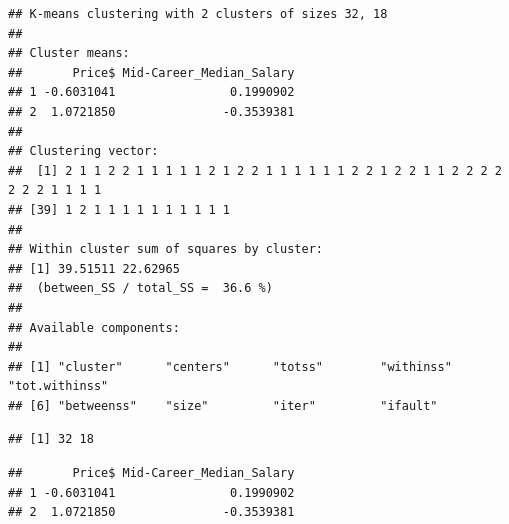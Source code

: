 \documentclass[]{article}
\newenvironment{Shaded}{\begin{snugshade}}{\end{snugshade}}
\newcommand{\KeywordTok}[1]{\textcolor[rgb]{0.13,0.29,0.53}{\textbf{#1}}}
\newcommand{\DecValTok}[1]{\textcolor[rgb]{0.00,0.00,0.81}{#1}}
\newcommand{\StringTok}[1]{\textcolor[rgb]{0.31,0.60,0.02}{#1}}
\newcommand{\OperatorTok}[1]{\textcolor[rgb]{0.81,0.36,0.00}{\textbf{#1}}}
\newcommand{\NormalTok}[1]{#1}
\begin{document}
\begin{Shaded}
\end{Shaded}

\begin{verbatim}
## K-means clustering with 2 clusters of sizes 32, 18
## 
## Cluster means:
##       Price$ Mid-Career_Median_Salary
## 1 -0.6031041                0.1990902
## 2  1.0721850               -0.3539381
## 
## Clustering vector:
##  [1] 2 1 1 2 2 1 1 1 1 1 2 1 2 2 1 1 1 1 1 1 2 2 1 2 2 1 1 2 2 2 2 2 2 2 1 1 1 1
## [39] 1 2 1 1 1 1 1 1 1 1 1 1
## 
## Within cluster sum of squares by cluster:
## [1] 39.51511 22.62965
##  (between_SS / total_SS =  36.6 %)
## 
## Available components:
## 
## [1] "cluster"      "centers"      "totss"        "withinss"     "tot.withinss"
## [6] "betweenss"    "size"         "iter"         "ifault"
\end{verbatim}

\begin{Shaded}
\end{Shaded}

\begin{verbatim}
## [1] 32 18
\end{verbatim}

\begin{Shaded}
\end{Shaded}

\begin{verbatim}
##       Price$ Mid-Career_Median_Salary
## 1 -0.6031041                0.1990902
## 2  1.0721850               -0.3539381
\end{verbatim}

\begin{Shaded}
\end{Shaded}
\end{document}
